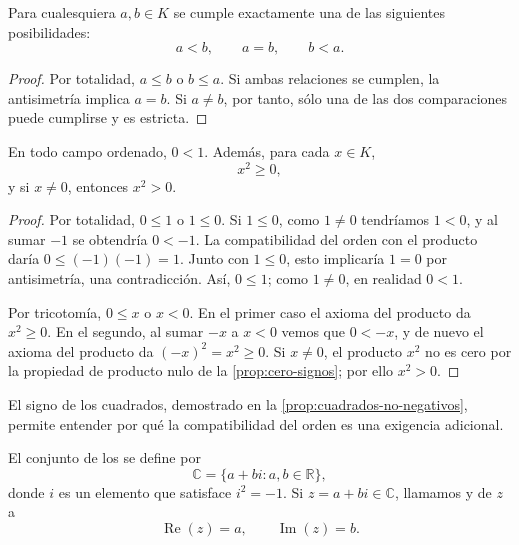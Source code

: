 \begin{samepage}
\begin{proposition}[Tricotomía]
\label{prop:tricotomia}
Para cualesquiera $a,b\in K$ se cumple exactamente una de las siguientes posibilidades:
\[
a<b,\qquad a=b,\qquad b<a.
\]
\end{proposition}
\end{samepage}

\begin{proof}
Por totalidad, $a\leq b$ o $b\leq a$. Si ambas relaciones se cumplen, la antisimetría implica $a=b$. Si $a\ne b$, por tanto, sólo una de las dos comparaciones puede cumplirse y es estricta.
\end{proof}

\begin{samepage}
\begin{proposition}
\label{prop:cuadrados-no-negativos}
En todo campo ordenado, $0<1$. Además, para cada $x\in K$,
\[
x^2\geq0,
\]
y si $x\ne0$, entonces $x^2>0$.
\end{proposition}
\end{samepage}

\begin{proof}
Por totalidad, $0\leq1$ o $1\leq0$. Si $1\leq0$, como $1\ne0$ tendríamos $1<0$, y al sumar $-1$ se obtendría $0<-1$. La compatibilidad del orden con el producto daría $0\leq(-1)(-1)=1$. Junto con $1\leq0$, esto implicaría $1=0$ por antisimetría, una contradicción. Así, $0\leq1$; como $1\ne0$, en realidad $0<1$.

Por tricotomía, $0\leq x$ o $x<0$. En el primer caso el axioma del producto da $x^2\geq0$. En el segundo, al sumar $-x$ a $x<0$ vemos que $0<-x$, y de nuevo el axioma del producto da $(-x)^2=x^2\geq0$. Si $x\ne0$, el producto $x^2$ no es cero por la propiedad de producto nulo de la \cref{prop:cero-signos}; por ello $x^2>0$.
\end{proof}

El signo de los cuadrados, demostrado en la \cref{prop:cuadrados-no-negativos}, permite entender por qué la compatibilidad del orden es una exigencia adicional.

\begin{samepage}
\begin{definition}
El conjunto de los  se define por
\[
\mathbb{C}=\{a+bi:a,b\in\mathbb{R}\},
\]
donde $i$ es un elemento que satisface $i^2=-1$. Si $z=a+bi\in\mathbb{C}$, llamamos  y  de $z$ a
\[
\operatorname{Re}(z)=a,\qquad \operatorname{Im}(z)=b.
\]
\end{definition}
\end{samepage}

